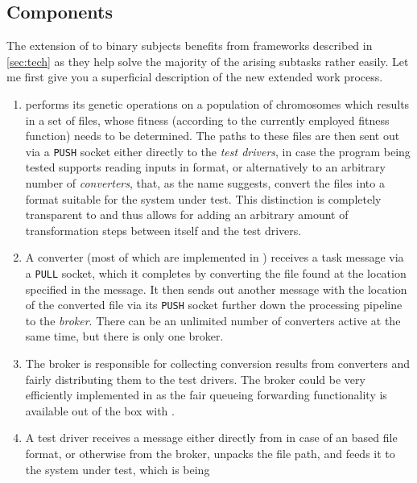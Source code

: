 \subsection{Components}
\label{sec:components}
The extension of \xmlmate to binary subjects benefits from frameworks described in \cref{sec:tech} as they 
help solve the majority of the arising subtasks rather easily. Let me first give you a superficial description
of the new extended \xmlmate work process. 
\begin{enumerate}
  \item \xmlmate performs its genetic operations on a population of chromosomes which results in a set of 
  \xml files, whose fitness (according to the currently employed fitness function) needs to be determined.
  The paths to these files are then sent out via a \zmq \texttt{PUSH} socket either directly to the 
  \emph{test drivers}, in case the program being tested supports reading inputs in \xml format, or alternatively 
  to an arbitrary number of \emph{converters}, that, as the name suggests, convert the \xml files into a format 
  suitable for the system under test. This distinction is completely transparent to \xmlmate and thus allows for 
  adding an arbitrary amount of transformation steps between itself and the test drivers.
  \item A converter (most of which are implemented in \python) receives a task message via a 
  \zmq \texttt{PULL} socket, which it completes by converting the file found at the location specified in the message. 
  It then sends out another message with the location of the converted file via its \texttt{PUSH} socket further 
  down the processing pipeline to the \emph{broker}.
  There can be an unlimited number of converters active at the same time, but there is only one broker.
  \item The broker is responsible for collecting conversion results from converters and fairly distributing them 
  to the test drivers. The broker could be very efficiently implemented in \python as the fair 
  queueing forwarding functionality is available out of the box with \zmq.
  \item A test driver receives a message either directly from \xmlmate in case of an \xml based file format, 
  or otherwise from the broker, unpacks the file path, and feeds it to the system under test, which is being 

\end{enumerate}

